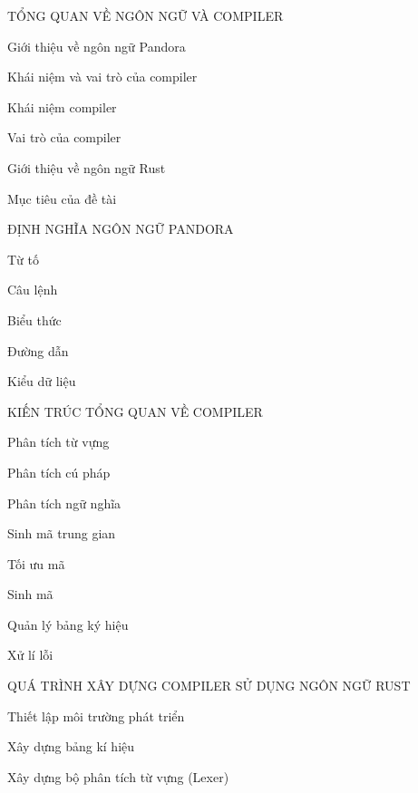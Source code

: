 \documentclass[11pt,a4paper]{article}
\begin{document}
    \begin{mucluc}
        \item TỔNG QUAN VỀ NGÔN NGỮ VÀ COMPILER
        \begin{mucluc}
            \item Giới thiệu về ngôn ngữ Pandora
            \item Khái niệm và vai trò của compiler
            \begin{mucluc}
                \item Khái niệm compiler
                \item Vai trò của compiler
            \end{mucluc}
            \item Giới thiệu về ngôn ngữ Rust
            \item Mục tiêu của đề tài
        \end{mucluc}
        \item ĐỊNH NGHĨA NGÔN NGỮ PANDORA
        \begin{mucluc}
            \item Từ tố
            \item Câu lệnh
            \item Biểu thức
            \item Đường dẫn
            \item Kiểu dữ liệu
        \end{mucluc}
        \item KIẾN TRÚC TỔNG QUAN VỀ COMPILER
        \begin{mucluc}
            \item Phân tích từ vựng
            \item Phân tích cú pháp
            \item Phân tích ngữ nghĩa
            \item Sinh mã trung gian
            \item Tối ưu mã
            \item Sinh mã
            \item Quản lý bảng ký hiệu
            \item Xử lí lỗi
        \end{mucluc}
        \item QUÁ TRÌNH XÂY DỰNG COMPILER SỬ DỤNG NGÔN NGỮ RUST
        \begin{mucluc}
            \item Thiết lập môi trường phát triển
            \item Xây dựng bảng kí hiệu
            \item Xây dựng bộ phân tích từ vựng (Lexer)

\end{mucluc}
\end{mucluc}
\end{document}
